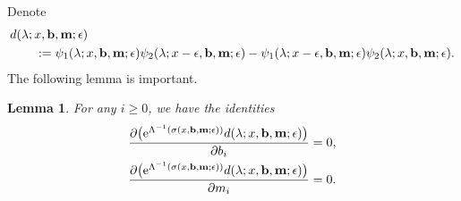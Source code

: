 \documentclass[pdftex]{sigma}
\newcommand{\e}{\epsilon}
\newcommand{\p}{\partial}
\numberwithin{equation}{section}
\newtheorem{Lemma}[Theorem]{Lemma}
\begin{document}
Denote
\begin{align*}
&d(\lambda; x, {\bf b}, {\bf m};\e) \\
&\qquad{}:= \psi_1(\lambda; x, {\bf b}, {\bf m};\e) \psi_2(\lambda; x-\e, {\bf b}, {\bf m};\e)
- \psi_1(\lambda; x-\e, {\bf b}, {\bf m};\e) \psi_2(\lambda; x, {\bf b}, {\bf m};\e).
\end{align*}
The following lemma is important.
\begin{Lemma}\label{keylemma}
For any $i\ge0$, we have the identities
\begin{align}
& \frac{\p \bigl({\rm e}^{\Lambda^{-1}(\sigma(x,{\bf b},{\bf m};\e))}d(\lambda; x, {\bf b}, {\bf m};\e)\bigr)}{\p b_i} =0 , \label{id1} \\
& \frac{\p \bigl({\rm e}^{\Lambda^{-1}(\sigma(x,{\bf b},{\bf m};\e))}d(\lambda; x, {\bf b}, {\bf m};\e)\bigr)}{\p m_i} =0. \label{id2}
\end{align}
\end{Lemma}
\end{document}
